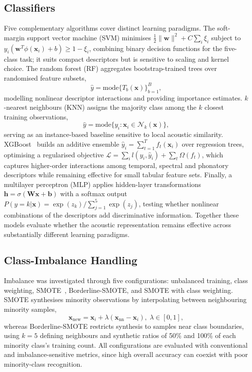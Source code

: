 \documentclass[runningheads]{llncs}
\begin{document}
\subsection{Classifiers}

Five complementary algorithms cover distinct learning paradigms. The
soft-margin support vector machine (SVM) minimises
$\frac{1}{2}\|\mathbf{w}\|^2 + C\sum_i \xi_i$ subject to
$y_i(\mathbf{w}^{T}\phi(\mathbf{x}_i)+b) \geq 1-\xi_i$, combining binary
decision functions for the five-class task; it suits compact descriptors but is
sensitive to scaling and kernel choice. The random forest (RF) aggregates
bootstrap-trained trees over randomised feature subsets,
\begin{equation}
\hat{y} = \mathrm{mode}\{T_b(\mathbf{x})\}_{b=1}^{B},
\label{eq:rf}
\end{equation}
modelling nonlinear descriptor interactions and providing importance
estimates.
$k$-nearest neighbours (KNN) assigns the majority class among the $k$ closest
training observations,
\begin{equation}
\hat{y} = \mathrm{mode}\{y_i : \mathbf{x}_i \in \mathcal{N}_k(\mathbf{x})\},
\label{eq:knn}
\end{equation}
serving as an instance-based baseline sensitive to
local acoustic similarity. XGBoost~\cite{chen2016xgboost} builds an additive
ensemble $\hat{y}_i = \sum_{t=1}^{T} f_t(\mathbf{x}_i)$ over regression trees,
optimising a regularised objective
$\mathcal{L} = \sum_i l(y_i,\hat{y}_i) + \sum_t \Omega(f_t)$, which captures
higher-order interactions among temporal, spectral and phonatory descriptors
while remaining effective for small tabular feature sets. Finally, a multilayer
perceptron (MLP) applies hidden-layer transformations
$\mathbf{h} = \sigma(\mathbf{W}\mathbf{x}+\mathbf{b})$ with a softmax output
$P(y=k|\mathbf{x}) = \exp(z_k)/\sum_{j=1}^{5}\exp(z_j)$, testing whether
nonlinear combinations of the descriptors add discriminative information.
Together these models evaluate whether the acoustic representation remains
effective across substantially different learning paradigms.

\subsection{Class-Imbalance Handling}
\label{sec:imbalance}

Imbalance was investigated through five configurations: unbalanced training,
class weighting, SMOTE~\cite{chawla2002smote}, Borderline-SMOTE, and SMOTE with
class weighting. SMOTE synthesises minority observations by interpolating
between neighbouring minority samples,
\begin{equation}
\mathbf{x}_{\mathrm{new}} = \mathbf{x}_i + \lambda(\mathbf{x}_{\mathrm{nn}} - \mathbf{x}_i), \; \lambda \in [0,1],
\label{eq:smote}
\end{equation}
whereas Borderline-SMOTE restricts synthesis to samples near class
boundaries, using $k=5$ defining neighbours and synthetic ratios of 50\%
and 100\% of each minority class's training count. All
configurations are evaluated with conventional and imbalance-sensitive metrics,
since high overall accuracy can coexist with poor minority-class recognition.
\end{document}
